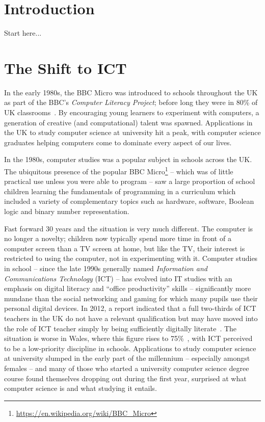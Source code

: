 
\section{Introduction}

Start here...

\section{The Shift to ICT}

In the early 1980s, the BBC Micro was introduced to schools throughout
the UK as part of the BBC's \emph{Computer Literacy Project}; before
long they were in 80\% of UK classrooms~\cite{vasko:1986}. By
encouraging young learners to experiment with computers, a generation
of creative (and computational) talent was spawned. Applications in
the UK to study computer science at university hit a peak, with
computer science graduates helping computers come to dominate every
aspect of our lives.

In the 1980s, computer studies was a popular subject in schools across
the UK. The ubiquitous presence of the popular BBC
Micro\footnote{\url{https://en.wikipedia.org/wiki/BBC_Micro}} -- which
was of little practical use unless you were able to program -- saw a
large proportion of school children learning the fundamentals of
programming in a curriculum which included a variety of complementary
topics such as hardware, software, Boolean logic and binary number
representation.

Fast forward 30 years and the situation is very much different. The
computer is no longer a novelty; children now typically spend more
time in front of a computer screen than a TV screen at home, but like
the TV, their interest is restricted to using the computer, not in
experimenting with it. Computer studies in school -- since the late
1990s generally named {\emph{Information and Communications
Technology}} (ICT) -- has evolved into IT studies with an emphasis on
digital literacy and ``office productivity'' skills -- significantly
more mundane than the social networking and gaming for which many
pupils use their personal digital devices. In 2012, a report indicated
that a full two-thirds of ICT teachers in the UK do not have a
relevant qualification but may have moved into the role of ICT teacher
simply by being sufficiently digitally literate~\cite{RoyalSoc:2012}.
The situation is worse in Wales, where this figure rises to
75\%~\cite{GTCW:2008}, with ICT perceived to be a low-priority
discipline in schools. Applications to study computer science at
university slumped in the early part of the millennium -- especially
amongst females -- and many of those who started a university computer
science degree course found themselves dropping out during the first
year, surprised at what computer science is and what studying it
entails.

